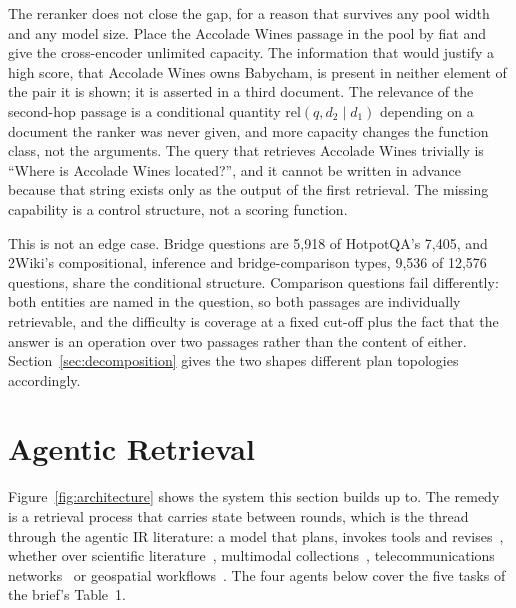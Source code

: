 The reranker does not close the gap, for a reason that survives any pool width
and any model size. Place the Accolade Wines passage in the pool by fiat and
give the cross-encoder unlimited capacity. The information that would justify
a high score, that Accolade Wines owns Babycham, is present in neither element
of the pair it is shown; it is asserted in a third document. The relevance of
the second-hop passage is a conditional quantity
$\mathrm{rel}(q, d_2 \mid d_1)$ depending on a document the ranker was never
given, and more capacity changes the function class, not the arguments. The
query that retrieves Accolade Wines trivially is ``Where is Accolade Wines
located?'', and it cannot be written in advance because that string exists
only as the output of the first retrieval. The missing capability is a control
structure, not a scoring function.

This is not an edge case. Bridge questions are 5{,}918 of HotpotQA's 7{,}405,
and 2Wiki's compositional, inference and bridge-comparison types, 9{,}536 of
12{,}576 questions, share the conditional structure. Comparison questions fail
differently: both entities are named in the question, so both passages are
individually retrievable, and the difficulty is coverage at a fixed cut-off
plus the fact that the answer is an operation over two passages rather than
the content of either. Section~\ref{sec:decomposition} gives the two shapes
different plan topologies accordingly.

\section{Agentic Retrieval}
\label{sec:agentic}

Figure~\ref{fig:architecture} shows the system this section builds up to.
The remedy is a retrieval process that carries state between rounds, which is
the thread through the agentic IR literature: a model that plans, invokes tools
and revises~\cite{zhang2024aiagent,wu2025agentic}, whether over scientific
literature~\cite{lala2023paperqa}, multimodal
collections~\cite{schneider2025collex}, telecommunications
networks~\cite{zhang2025toward} or geospatial
workflows~\cite{lee2025multiagent}. The four agents below cover the five tasks
of the brief's Table~1.

